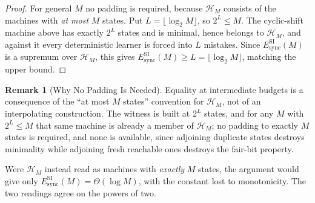 \documentclass[12pt]{article}
\theoremstyle{definition}
\newtheorem{remark}[theorem]{Remark}
\newcommand{\EsyncSI}{E_{\mathrm{sync}}^{\mathrm{SI}}}
\begin{document}
\begin{proof}
For general $M$ no padding is required, because $\mathcal H_M$ consists of the
machines with \emph{at most} $M$ states.  Put $L=\lfloor\log_2M\rfloor$, so
$2^L\le M$.  The cyclic-shift machine above has exactly $2^L$ states and is
minimal, hence belongs to $\mathcal H_M$, and against it every deterministic
learner is forced into $L$ mistakes.  Since $\EsyncSI(M)$ is a supremum over
$\mathcal H_M$, this gives $\EsyncSI(M)\ge L=\lfloor\log_2M\rfloor$, matching
the upper bound.
\end{proof}

\begin{remark}[Why No Padding Is Needed]
\label{rem:esyncsi-intermediate}
Equality at intermediate budgets is a consequence of the ``at most $M$
states'' convention for $\mathcal H_M$, not of an interpolating construction.
The witness is built at $2^L$ states, and for any $M$ with $2^L\le M$ that same
machine is already a member of $\mathcal H_M$; no padding to exactly $M$ states
is required, and none is available, since adjoining duplicate states destroys
minimality while adjoining fresh reachable ones destroys the fair-bit property.

Were $\mathcal H_M$ instead read as machines with \emph{exactly} $M$ states,
the argument would give only $\EsyncSI(M)=\Theta(\log M)$, with the constant
lost to monotonicity.  The two readings agree on the powers of two.
\end{remark}
\end{document}
